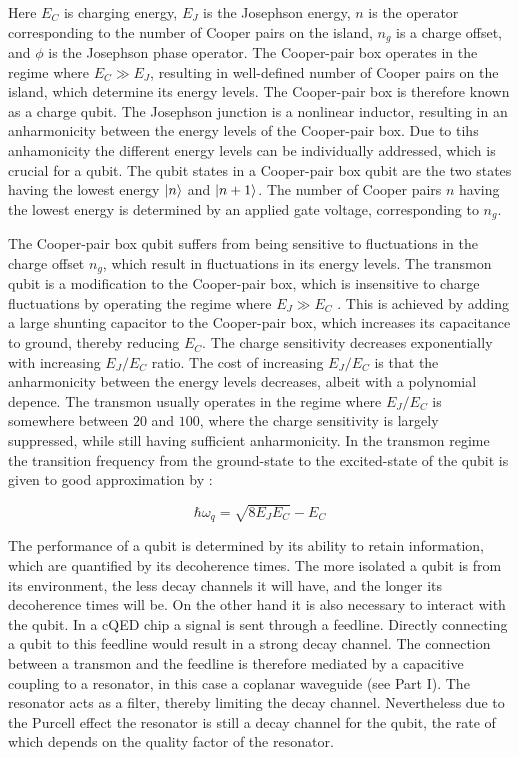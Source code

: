       Here $E_C$ is charging energy, $E_J$ is the Josephson energy, $n$ is the operator corresponding to the number of Cooper pairs on the island, $n_g$ is a charge offset, and $\phi$ is the Josephson phase operator. The Cooper-pair box operates in the regime where $E_C \gg E_J$, resulting in well-defined number of Cooper pairs on the island, which determine its energy levels. The Cooper-pair box is therefore known as a charge qubit. The Josephson junction is a nonlinear inductor, resulting in an anharmonicity between the energy levels of the Cooper-pair box. Due to tihs anhamonicity the different energy levels can be individually addressed, which is crucial for a qubit. The qubit states in a Cooper-pair box qubit are the two states having the lowest energy $\ket{n}$ and $\ket{n+1}$. The number of Cooper pairs $n$ having the lowest energy is determined by an applied gate voltage, corresponding to $n_g$.

      The Cooper-pair box qubit suffers from being sensitive to fluctuations in the charge offset $n_g$, which result in fluctuations in its energy levels. The transmon qubit is a modification to the Cooper-pair box, which is insensitive to charge fluctuations by operating the regime where $E_J \gg E_C$ \cite{koch2007Transmon,schreier2008suppressing}. This is achieved by adding a large shunting capacitor to the Cooper-pair box, which increases its capacitance to ground, thereby reducing $E_C$. The charge sensitivity decreases exponentially with increasing $E_J/E_C$ ratio. The cost of increasing $E_J/E_C$ is that the anharmonicity between the energy levels decreases, albeit with a polynomial depence. The transmon usually operates in the regime where $E_J/E_C$ is somewhere between $20$ and $100$, where the charge sensitivity is largely suppressed, while still having sufficient anharmonicity. In the transmon regime the transition frequency from the ground-state to the excited-state of the qubit is given to good approximation by \cite[p.52]{Reed}:

      \begin{equation}
        \hbar \omega_q = \sqrt{8 E_J E_C} - E_C
        \label{eq:transmon frequency}
      \end{equation}

      The performance of a qubit is determined by its ability to retain information, which are quantified by its decoherence times. The more isolated a qubit is from its environment, the less decay channels it will have, and the longer its decoherence times will be. On the other hand it is also necessary to interact with the qubit. In a cQED chip a signal is sent through a feedline. Directly connecting a qubit to this feedline would result in a strong decay channel. The connection between a transmon and the feedline is therefore mediated by a capacitive coupling to a resonator, in this case a coplanar waveguide (see Part I). The resonator acts as a filter, thereby limiting the decay channel. Nevertheless due to the Purcell effect the resonator is still a decay channel for the qubit, the rate of which depends on the quality factor of the resonator.

